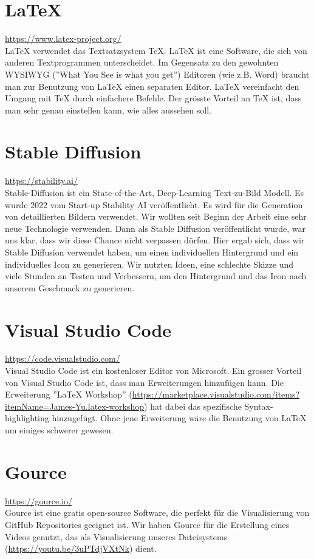 \section{LaTeX}
\url{https://www.latex-project.org/}\\
LaTeX verwendet das Textsatzsystem TeX. LaTeX ist eine Software, die sich von anderen Textprogrammen unterscheidet. Im Gegensatz zu den gewohnten WYSIWYG (''What You See is what you get'') Editoren (wie z.B. Word)
braucht man zur Benutzung von LaTeX einen separaten Editor. LaTeX vereinfacht den Umgang mit TeX durch einfachere Befehle. Der grösste Vorteil an TeX ist, dass man sehr genau einstellen kann, wie alles aussehen soll.


\section{Stable Diffusion}
\url{https://stability.ai/}\\
Stable-Diffusion ist ein State-of-the-Art, Deep-Learning Text-zu-Bild Modell. Es wurde 2022 vom Start-up Stability AI veröffentlicht. Es wird für die Generation von detaillierten Bildern verwendet. Wir wollten seit
Beginn der Arbeit eine sehr neue Technologie verwenden. Dann als Stable Diffusion veröffentlicht wurde, war uns klar, dass wir diese Chance nicht verpassen dürfen. Hier ergab sich, dass wir Stable Diffusion verwendet haben, um einen individuellen
Hintergrund und ein individuelles Icon zu generieren. Wir nutzten Ideen, eine schlechte Skizze und viele Stunden an Testen und Verbessern, um den Hintergrund und das Icon nach unserem Geschmack zu generieren.

\section{Visual Studio Code}
\url{https://code.visualstudio.com/}\\
Visual Studio Code ist ein kostenloser Editor von Microsoft. Ein grosser Vorteil von Visual Studio Code ist, dass man Erweiterungen hinzufügen kann. Die Erweiterung ''LaTeX Workshop'' (\url{https://marketplace.visualstudio.com/items?itemName=James-Yu.latex-workshop})
hat dabei das spezifische Syntax-highlighting hinzugefügt. Ohne jene Erweiterung wäre die Benutzung von LaTeX um einiges schwerer gewesen.

\section{Gource}
\url{https://gource.io/}\\
Gource ist eine gratis open-source Software, die perfekt für die Visualisierung von GitHub Repositories geeignet ist. Wir haben Gource für die Erstellung eines Videos genutzt, das als Visualisierung unseres Dateisystems (\url{https://youtu.be/3uPTdjVXtNk})
dient.

